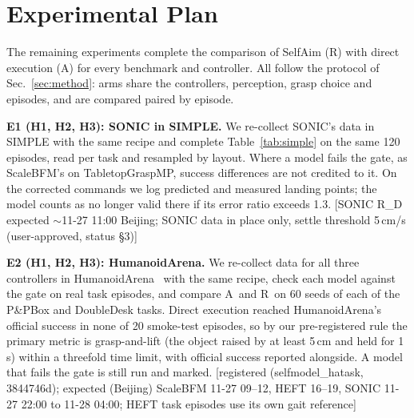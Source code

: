\documentclass[conference]{IEEEtran}
\newif\ifdraft \drafttrue
\newcommand{\dnote}[1]{\ifdraft{\color{red}\footnotesize[#1]}\fi}
\newcommand{\Ad}{\textsc{A}}       %
\newcommand{\Rr}{\textsc{R}}       %
\begin{document}
\section{Experimental Plan}\label{sec:plan}
The remaining experiments complete the comparison of SelfAim (\Rr) with direct execution (\Ad) for every benchmark and controller. All follow the protocol of Sec.~\ref{sec:method}: arms share the controllers, perception, grasp choice and episodes, and are compared paired by episode.

\textbf{E1 (H1, H2, H3): SONIC in SIMPLE.} We re-collect SONIC's data in SIMPLE with the same recipe and complete Table~\ref{tab:simple} on the same 120 episodes, read per task and resampled by layout. Where a model fails the gate, as ScaleBFM's on TabletopGraspMP, success differences are not credited to it. On the corrected commands we log predicted and measured landing points; the model counts as no longer valid there if its error ratio exceeds 1.3.
\dnote{SONIC R\_D expected $\sim$11-27 11:00 Beijing; SONIC data in place only, settle threshold 5\,cm/s (user-approved, status §3)}

\textbf{E2 (H1, H2, H3): HumanoidArena.} We re-collect data for all three controllers in HumanoidArena~\cite{humanoidarena} with the same recipe, check each model against the gate on real task episodes, and compare \Ad\ and \Rr\ on 60 seeds of each of the P\&PBox and DoubleDesk tasks. Direct execution reached HumanoidArena's official success in none of 20 smoke-test episodes, so by our pre-registered rule the primary metric is grasp-and-lift (the object raised by at least 5\,cm and held for 1\,s) within a threefold time limit, with official success reported alongside. A model that fails the gate is still run and marked.
\dnote{registered (selfmodel\_hatask, 3844746d); expected (Beijing) ScaleBFM 11-27 09--12, HEFT 16--19, SONIC 11-27 22:00 to 11-28 04:00; HEFT task episodes use its own gait reference}
\end{document}
